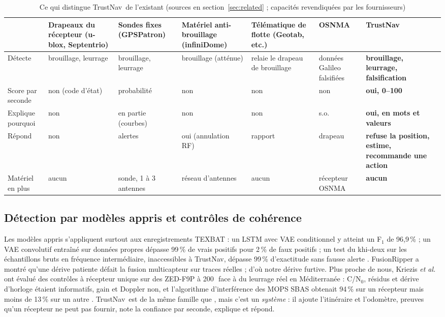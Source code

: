 \documentclass[conference]{IEEEtran}
\newcommand{\sys}{TrustNav}
\begin{document}
\begin{table}[t]
\caption{Ce qui distingue \sys\ de l'existant (sources en section~\ref{sec:related} ; capacités revendiquées par les fournisseurs)}
\label{tab:compare}
\centering
\scriptsize
\setlength{\tabcolsep}{4pt}
\begin{tabular}{@{}>{\raggedright}p{2.2cm}>{\raggedright}p{2.15cm}>{\raggedright}p{2.15cm}>{\raggedright}p{2.15cm}>{\raggedright}p{2.15cm}>{\raggedright}p{2.15cm}>{\raggedright\arraybackslash}p{2.9cm}@{}}
\toprule
 & Drapeaux du récepteur (u-blox, Septentrio) & Sondes fixes (GPSPatron) & Matériel anti-brouillage (infiniDome) & Télématique de flotte (Geotab, etc.) & OSNMA & \textbf{\sys} \\
\midrule
Détecte & brouillage, leurrage & brouillage, leurrage & brouillage (atténue) & relaie le drapeau de brouillage & données Galileo falsifiées & \textbf{brouillage, leurrage, falsification} \\
Score par seconde & non (code d'état) & probabilité & non & non & non & \textbf{oui, 0--100} \\
Explique pourquoi & non & en partie (courbes) & non & non & s.o. & \textbf{oui, en mots et valeurs} \\
Répond & non & alertes & oui (annulation RF) & rapport & drapeau & \textbf{refuse la position, estime, recommande une action} \\
Matériel en plus & aucun & sonde, 1 à 3 antennes & réseau d'antennes & aucun & récepteur OSNMA & \textbf{aucun} \\
\bottomrule
\end{tabular}
\end{table}

\subsection{Détection par modèles appris et contrôles de cohérence}
Les modèles appris s'appliquent surtout aux enregistrements TEXBAT \cite{texbat} : un LSTM avec VAE conditionnel y atteint un F$_1$ de 96,9\,\% \cite{tang2025} ; un VAE convolutif entraîné sur données propres dépasse 99\,\% de vrais positifs pour 2\,\% de faux positifs \cite{iqbal2025} ; un test du khi-deux sur les échantillons bruts en fréquence intermédiaire, inaccessibles à \sys, dépasse 99\,\% d'exactitude sans fausse alerte \cite{bhuiyan2026}. FusionRipper a montré qu'une dérive patiente défait la fusion multicapteur sur traces réelles \cite{shen2020} ; d'où notre dérive furtive. Plus proche de nous, Kriezis \emph{et al.} ont évalué des contrôles à récepteur unique sur des ZED-F9P à 200\,\texteuro\ face à du leurrage réel en Méditerranée : C/N$_0$, résidus et dérive d'horloge étaient informatifs, gain et Doppler non, et l'algorithme d'interférence des MOPS SBAS obtenait 94\,\% sur un récepteur mais moins de 13\,\% sur un autre \cite{kriezis2025}. \sys\ est de la même famille que \cite{iqbal2025}, mais c'est un \emph{système} : il ajoute l'itinéraire et l'odomètre, preuves qu'un récepteur ne peut pas fournir, note la confiance par seconde, explique et répond.
\end{document}

